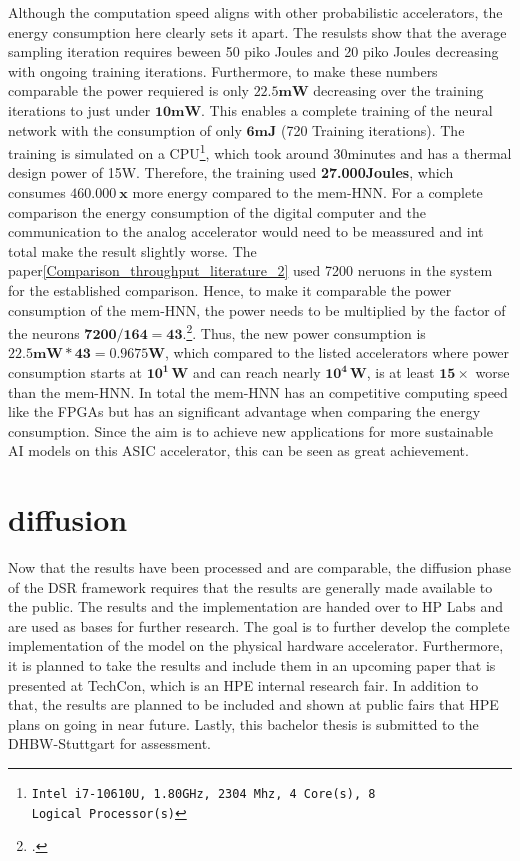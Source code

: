 Although the computation speed aligns with other probabilistic accelerators, the energy consumption here clearly sets it apart.
The resulsts show that the average sampling iteration requires beween 50 piko Joules and 20 piko Joules decreasing with ongoing training iterations.
Furthermore, to make these numbers comparable the power requiered is only \(\mathbf{22.5mW}\) decreasing over the training iterations to just under \(\mathbf{10mW}\).
This enables a complete training of the neural network with the consumption of only \(\mathbf{6 mJ}\) (720 Training iterations).
The training is simulated on a CPU\footnote{\texttt{Intel i7-10610U, 1.80GHz, 2304 Mhz, 4 Core(s), 8 Logical Processor(s)}}, which took around 30minutes and has a thermal design power of 15W.
Therefore, the training used \textbf{27.000Joules}, which consumes \(\mathbf{460.000 \ x}\) more energy compared to the \ac{mem-HNN}.
For a complete comparison the energy consumption of the digital computer and the communication to the analog accelerator would need to be meassured 
and int total make the result slightly worse. 
The paper\ref{Comparison_throughput_literature_2} used 7200 neruons in the system for the established comparison. 
Hence, to make it comparable the power consumption of the \ac{mem-HNN}, the power needs to be multiplied by the factor of the neurons \(\mathbf{7200/164=43}\).\footcite[cf.][2]{aaditAcceleratingAdaptiveParallel2023}.
Thus, the new power consumption is \(\mathbf{22.5mW * 43 = 0.9675W}\), which compared to the listed accelerators
where power consumption starts at \(\mathbf{10^1 \, W}\) and can reach nearly \(\mathbf{10^4 \, W}\), is at least \(\mathbf{15 \times}\) worse than the \ac{mem-HNN}.
In total the \ac{mem-HNN} has an competitive computing speed like the \ac{FPGA}s but has an significant advantage when comparing the energy consumption.
Since the aim is to achieve new applications for more sustainable AI models on this \ac{ASIC} accelerator, 
this can be seen as great achievement.

\section{diffusion}
Now that the results have been processed and are comparable, the diffusion phase of the \ac{DSR} framework 
requires that the results are generally made available to the public. 
The results and the implementation are handed over to HP Labs and are used as 
bases for further research.
The goal is to further develop the complete implementation of the model on the physical hardware accelerator.
Furthermore, it is planned to take the results and include them in an upcoming paper that is presented
at TechCon, which is an HPE internal research fair. 
In addition to that, the results are planned to be included and shown at public fairs that HPE plans on going in near future.
Lastly, this bachelor thesis is submitted to the DHBW-Stuttgart for assessment. 
